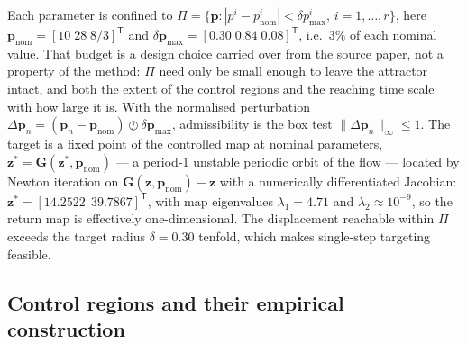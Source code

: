 Each parameter is confined to
$\Pi=\{\mathbf{p}:|p^{i}-p^{i}_{\mathrm{nom}}|<\delta p^{i}_{\max},\,i=1,\dots,r\}$,
here $\mathbf{p}_{\mathrm{nom}}=[10\;28\;8/3]^{\mathsf T}$ and
$\delta\mathbf{p}_{\max}=[0.30\;0.84\;0.08]^{\mathsf T}$, i.e.\ $3\%$ of each
nominal value. That budget is a design choice carried over from the source
paper, not a property of the method: $\Pi$ need only be small enough to leave
the attractor intact, and both the extent of the control regions and the
reaching time scale with how large it is. With the normalised perturbation
$\Delta\mathbf{p}_n=(\mathbf{p}_n-\mathbf{p}_{\mathrm{nom}})\oslash\delta\mathbf{p}_{\max}$,
admissibility is the box test $\|\Delta\mathbf{p}_n\|_{\infty}\le1$. The target
is a fixed point of the controlled map at nominal parameters,
$\mathbf{z}^{*}=\mathbf{G}(\mathbf{z}^{*},\mathbf{p}_{\mathrm{nom}})$ --- a
period-1 unstable periodic orbit of the flow --- located by Newton iteration on
$\mathbf{G}(\mathbf{z},\mathbf{p}_{\mathrm{nom}})-\mathbf{z}$ with a
numerically differentiated Jacobian:
$\mathbf{z}^{*}=[14.2522\;\,39.7867]^{\mathsf T}$, with map eigenvalues
$\lambda_1=4.71$ and $\lambda_2\approx10^{-9}$, so the return map is
effectively one-dimensional. The displacement reachable within $\Pi$ exceeds
the target radius $\delta=0.30$ tenfold, which makes single-step targeting
feasible.

\subsection{Control regions and their empirical construction}
\label{subsec:ecr-regions}


